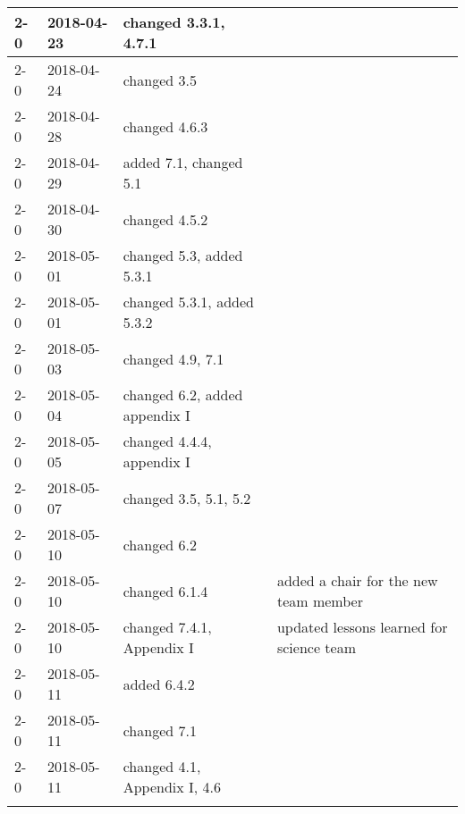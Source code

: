 \begin{longtable}{|p{}| p{} |p{} |p{}|}
    2-0     &   2018-04-23   & changed 3.3.1, 4.7.1 &\\\hline
    2-0     &   2018-04-24   & changed 3.5  & \\\hline
    2-0     &   2018-04-28   & changed 4.6.3 & \\\hline
    2-0     &   2018-04-29   & added 7.1, changed 5.1 &   \\\hline
    2-0     &   2018-04-30   & changed 4.5.2 &   \\\hline
    2-0     &   2018-05-01   & changed 5.3, added 5.3.1 &   \\\hline
    2-0     &   2018-05-01   & changed 5.3.1, added 5.3.2 &   \\\hline
    2-0     &   2018-05-03   & changed 4.9, 7.1 & \\\hline
    2-0     &   2018-05-04   & changed 6.2, added appendix I & \\\hline
    2-0     &   2018-05-05   & changed 4.4.4, appendix I & \\\hline
    2-0     &   2018-05-07   & changed 3.5, 5.1, 5.2 & \\\hline
    2-0     &   2018-05-10   & changed 6.2 & \\\hline
    2-0     &   2018-05-10   & changed 6.1.4 & added a chair for the new team member  \\\hline
    2-0     &   2018-05-10   & changed 7.4.1, Appendix I & updated lessons learned for science team  \\\hline
    2-0     &   2018-05-11   & added 6.4.2 &  \\\hline
    2-0     &   2018-05-11   & changed 7.1 &  \\\hline
    2-0     &   2018-05-11   & changed 4.1, Appendix I, 4.6 &  \\\hline
    \label{COR}
\end{longtable}
